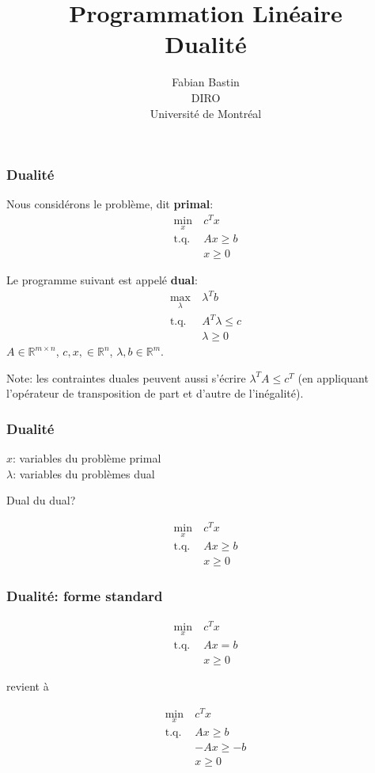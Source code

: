 \documentclass[usepdftitle=false]{beamer}
\title[Dualité]{Programmation Linéaire\\Dualité}
\author[Fabian Bastin]{Fabian Bastin\\DIRO\\Université de Montréal\\}
\date{}
\def\RR{\mathbb{R}}
\begin{document}
\frame{\titlepage}


\begin{frame}
\frametitle{Dualité}

Nous considérons le problème, dit {\bf primal}:
\begin{align*}
\min_x \ & c^T x \\
\mbox{t.q. } & Ax \geq b \\
& x \geq 0
\end{align*}

\mbox{}

Le programme suivant est appelé {\bf dual}:
\begin{align*}
\max_{\lambda} \ & \lambda^T b \\
\mbox{t.q. } & A^T \lambda \leq c \\
& \lambda \geq 0
\end{align*}
$A \in \RR^{m \times n}$, $c, x, \in \RR^n$, $\lambda, b \in \RR^m$.

Note: les contraintes duales peuvent aussi s'écrire $\lambda^T A \leq c^T$ (en appliquant l'opérateur de transposition de part et d'autre de l'inégalité).

\end{frame}

\begin{frame}
\frametitle{Dualité}

$x$: variables du problème primal\\
$\lambda$: variables du problèmes dual

\mbox{}

Dual du dual?

\mbox{}

\begin{align*}
\min_x \ & c^T x \\
\mbox{t.q. } & Ax \geq b \\
& x \geq 0
\end{align*}

\end{frame}

\begin{frame}
\frametitle{Dualité: forme standard}

\begin{align*}
\min_x \ & c^T x \\
\mbox{t.q. } & Ax = b \\
& x \geq 0
\end{align*}

revient à

\begin{align*}
\min_x \ & c^T x \\
\mbox{t.q. } & Ax \geq b \\
& -Ax \geq -b \\
& x \geq 0
\end{align*}

\end{frame}
\end{document}
